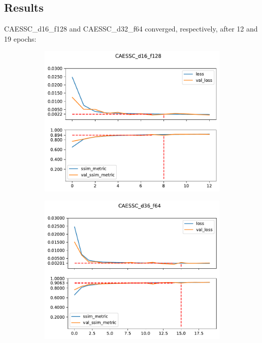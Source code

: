 \subsection{Results}
CAESSC\_d16\_f128 and CAESSC\_d32\_f64 converged, respectively, after 12 and 19 epochs:
\begin{figure}[H]
    \begin{subfigure}{\textwidth}
        \centering
        \includegraphics[height=0.37\textheight,keepaspectratio]{subsections/caessc/plot_history_CAESSC_d16_f128.pdf}
    \end{subfigure}
    \begin{subfigure}{\textwidth}
        \centering
        \includegraphics[height=0.37\textheight,keepaspectratio]{subsections/caessc/plot_history_CAESSC_d36_f64.pdf}
    \end{subfigure}
\end{figure} 

